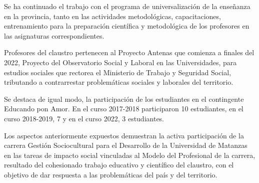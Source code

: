 Se ha continuado el trabajo con el programa de universalización de la enseñanza en la provincia, tanto en las actividades metodológicas, capacitaciones, entrenamiento para la preparación científica y metodológica de los profesores en las asignaturas correspondientes.

Profesores del claustro pertenecen al Proyecto Antenas que comienza a finales del 2022, Proyecto del Observatorio Social y Laboral en las Universidades, para estudios sociales que rectorea el Ministerio de Trabajo y Seguridad Social, tributando a contrarrestar problemáticas sociales y laborales del territorio.

Se destaca de igual modo, la participación de los estudiantes en el contingente Educando pon Amor. En el curso 2017-2018 participaron 10 estudiantes, en el curso 2018-2019, 7 y en el curso 2022, 3 estudiantes.

Los aspectos anteriormente expuestos demuestran la activa participación de la carrera Gestión Sociocultural para el Desarrollo de la Universidad de Matanzas en las tareas de impacto social vinculadas al Modelo del Profesional de la carrera, resultado del cohesionado trabajo educativo y científico del claustro, con el objetivo de dar respuesta a las problemáticas del país y del territorio.